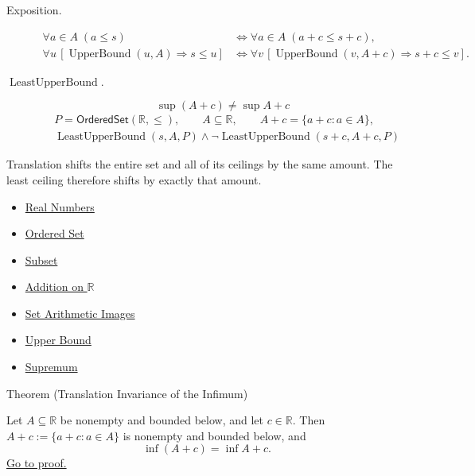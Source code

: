 \begin{remark*}
\begin{description}
  \item[Exposition.]
\[
\begin{aligned}
\forall a\in A\;(a\leq s)
&\Longleftrightarrow
\forall a\in A\;(a+c\leq s+c),\\
\forall u\,[\operatorname{UpperBound}(u,A)\Longrightarrow s\leq u]
&\Longleftrightarrow
\forall v\,[\operatorname{UpperBound}(v,A+c)\Longrightarrow s+c\leq v].
\end{aligned}
\]


  \item[\(\operatorname{LeastUpperBound}.\)]
  \[
\sup(A+c)\ne \sup A+c
\]
\[
\begin{aligned}
&P=\mathsf{OrderedSet}(\mathbb{R},\leq),\qquad A\subseteq\mathbb{R},\qquad A+c=\{a+c:a\in A\},\\
&\operatorname{LeastUpperBound}(s,A,P)\land
\neg\operatorname{LeastUpperBound}(s+c,A+c,P)
\end{aligned}
\]
\end{description}
\end{remark*}

\begin{remark*}[Interpretation]
Translation shifts the entire set and all of its ceilings by the same amount. The least ceiling therefore shifts by exactly that amount.
\end{remark*}

\begin{dependencies}
\begin{itemize}
  \item \hyperref[def:reals]{Real Numbers}
  \item \hyperref[def:ordered-set]{Ordered Set}
  \item \hyperref[def:subset]{Subset}
  \item \hyperref[def:addition-on-r]{Addition on $\mathbb{R}$}
  \item \hyperref[def:set-arithmetic-images]{Set Arithmetic Images}
  \item \hyperref[def:real-upper-bound]{Upper Bound}
  \item \hyperref[def:supremum]{Supremum}
\end{itemize}
\end{dependencies}

\begin{theorembox}{Theorem (Translation Invariance of the Infimum)}
\begin{theorem}
\label{thm:translation-invariance-infimum}
Let $A\subseteq\mathbb{R}$ be nonempty and bounded below, and let
$c\in\mathbb{R}$.  Then $A+c:=\{a+c:a\in A\}$ is nonempty and bounded below,
and
\[
  \inf(A+c)=\inf A+c.
\]
\hyperref[prf:translation-invariance-infimum]{Go to proof.}
\end{theorem}
\end{theorembox}

